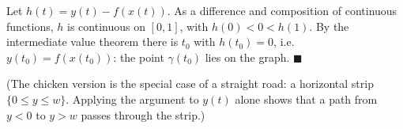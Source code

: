 Let $h(t)=y(t)-f(x(t))$. As a difference and composition of continuous functions, $h$ is continuous on $[0,1]$, with $h(0)<0<h(1)$. By the intermediate value theorem there is $t_0$ with $h(t_0)=0$, i.e. $y(t_0)=f(x(t_0))$: the point $\gamma(t_0)$ lies on the graph. $\blacksquare$

(The chicken version is the special case of a straight road: a horizontal strip $\{0\le y\le w\}$. Applying the argument to $y(t)$ alone shows that a path from $y<0$ to $y>w$ passes through the strip.)
